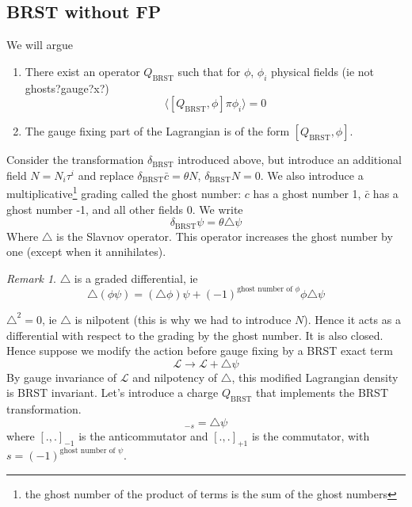 \documentclass[a4paper]{book}
\theoremstyle{definition}
\theoremstyle{remark}
\newtheorem*{remark}{Remark}
\begin{document}
\subsection{BRST without FP}
We will argue 
\begin{enumerate}
    \item There exist an operator $Q_{\text{BRST}}$ such that for $\phi$, $\phi_i$ physical fields (ie not ghosts?gauge?x?) 
    \begin{equation}
        \langle [Q_{\text{BRST}}, \phi ] \pi \phi_i\rangle = 0
    \end{equation}
    \item The gauge fixing part of the Lagrangian is of the form $[Q_{\text{BRST}}, \phi ]$. 
\end{enumerate}
Consider the transformation $\delta_{\text{BRST}}$ introduced above, but introduce an additional field $N = N_i \tau^i$ and replace $\delta_{\text{BRST}} \bar{ c} = \theta N$, $\delta_{\text{BRST}} N = 0$. We also introduce a multiplicative\footnote{the ghost number of the product of terms is the sum of the ghost numbers} grading called the ghost number: $c$ has a ghost number 1, $\bar c$ has a ghost number -1, and all other fields 0. We write 
\begin{equation}
    \delta_{\text{BRST}} \psi = \theta \triangle \psi
\end{equation}
Where $\triangle$ is the Slavnov operator. This operator increases the ghost number by one (except when it annihilates). 

\begin{remark}
    $\triangle$ is a graded differential, ie 
    \begin{equation}
        \triangle(\phi \psi) = (\triangle \phi)\psi + (-1)^{\text{ghost number of }\phi}\phi\triangle\psi
    \end{equation}
\end{remark}

$\triangle ^2 = 0$, ie $\triangle$ is nilpotent (this is why we had to introduce $N$). Hence it acts as a differential with respect to the grading by the ghost number. It is also closed. Hence suppose we modify the action before gauge fixing by a BRST exact term 
\begin{equation}
    \mathcal L \rightarrow \mathcal L + \triangle \psi 
\end{equation}
By gauge invariance of $\mathcal L$ and nilpotency of $\triangle$, this modified Lagrangian density is BRST invariant. Let's introduce a charge $Q_{\text{BRST}}$ that implements the BRST transformation. 
\begin{equation}
    [Q_{\text{BRST}}, \psi]_{-s} =  \triangle \psi 
\end{equation}
where $[.,.]_{-1}$ is the anticommutator and $[.,.]_{+1}$ is the commutator, with $s = (-1)^{\text{ghost number of }\psi}$. \par\medskip 
\end{document}
